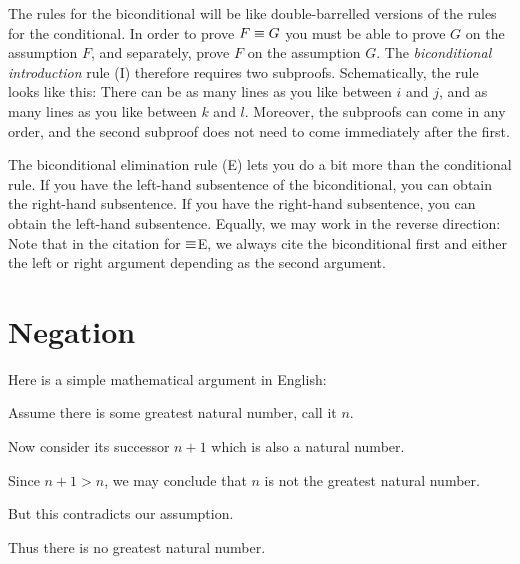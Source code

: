 The rules for the biconditional will be like double-barrelled versions of the rules for the conditional.
In order to prove $F \equiv G$  you must be able to prove $G$ on the assumption $F$, and separately, prove $F$ on the assumption $G$.
The \textit{biconditional introduction} rule ({\eiff}I) therefore requires two subproofs.
Schematically, the rule looks like this: 
There can be as many lines as you like between $i$ and $j$, and as many lines as you like between $k$ and $l$.
Moreover, the subproofs can come in any order, and the second subproof does not need to come immediately after the first.

The biconditional elimination rule ({\eiff}E) lets you do a bit more than the conditional rule.
If you have the left-hand subsentence of the biconditional, you can obtain the right-hand subsentence.
If you have the right-hand subsentence, you can obtain the left-hand subsentence.
Equally, we may work in the reverse direction:
Note that in the citation for $\equiv$E, we always cite the biconditional first and either the left or right argument depending as the second argument.



\section{Negation}

Here is a simple mathematical argument in English:

\begin{earg}
\item[] Assume there is some greatest natural number, call it $n$.
\item[] Now consider its successor $n+1$ which is also a natural number.
\item[] Since $n+1 > n$, we may conclude that $n$ is not the greatest natural number. 
\item[] But this contradicts our assumption. 
\item[\therefore] Thus there is no greatest natural number.
\end{earg}

